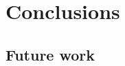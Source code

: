 \chapter{\texorpdfstring{Conclusions}{Conclusions}}\label{chap:conclusao}


\section{\texorpdfstring{Future work}{Future work}}\label{sec:future-work}



